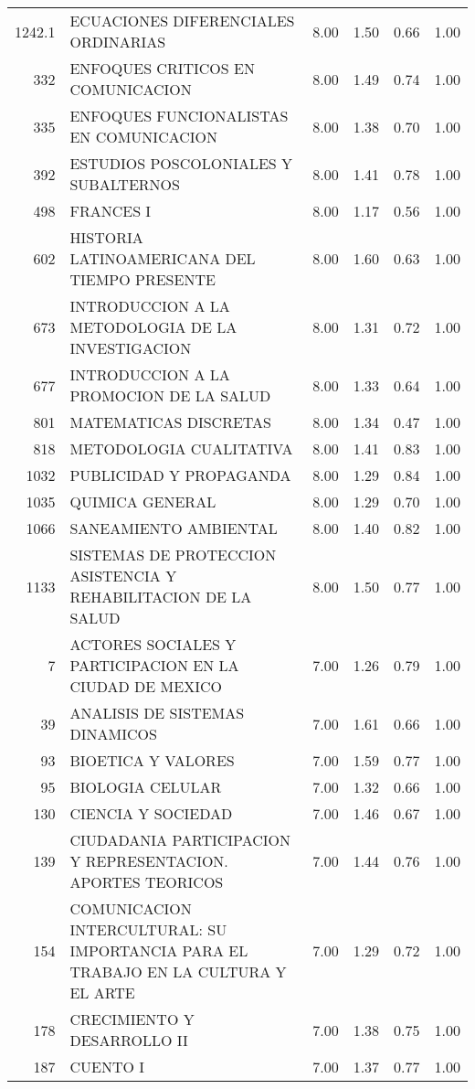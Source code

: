 \begin{table}[ht]
\begin{tabular}{rlrrrr}
  1242.1 & ECUACIONES DIFERENCIALES ORDINARIAS & 8.00 & 1.50 & 0.66 & 1.00 \\ 
  332 & ENFOQUES CRITICOS EN COMUNICACION & 8.00 & 1.49 & 0.74 & 1.00 \\ 
  335 & ENFOQUES FUNCIONALISTAS EN COMUNICACION & 8.00 & 1.38 & 0.70 & 1.00 \\ 
  392 & ESTUDIOS POSCOLONIALES Y SUBALTERNOS & 8.00 & 1.41 & 0.78 & 1.00 \\ 
  498 & FRANCES I & 8.00 & 1.17 & 0.56 & 1.00 \\ 
  602 & HISTORIA LATINOAMERICANA DEL TIEMPO PRESENTE & 8.00 & 1.60 & 0.63 & 1.00 \\ 
  673 & INTRODUCCION A LA METODOLOGIA DE LA INVESTIGACION & 8.00 & 1.31 & 0.72 & 1.00 \\ 
  677 & INTRODUCCION A LA PROMOCION DE LA SALUD & 8.00 & 1.33 & 0.64 & 1.00 \\ 
  801 & MATEMATICAS DISCRETAS & 8.00 & 1.34 & 0.47 & 1.00 \\ 
  818 & METODOLOGIA CUALITATIVA & 8.00 & 1.41 & 0.83 & 1.00 \\ 
  1032 & PUBLICIDAD Y PROPAGANDA & 8.00 & 1.29 & 0.84 & 1.00 \\ 
  1035 & QUIMICA GENERAL & 8.00 & 1.29 & 0.70 & 1.00 \\ 
  1066 & SANEAMIENTO AMBIENTAL & 8.00 & 1.40 & 0.82 & 1.00 \\ 
  1133 & SISTEMAS DE PROTECCION ASISTENCIA Y REHABILITACION DE LA SALUD & 8.00 & 1.50 & 0.77 & 1.00 \\ 
  7 & ACTORES SOCIALES Y PARTICIPACION EN LA CIUDAD DE MEXICO & 7.00 & 1.26 & 0.79 & 1.00 \\ 
  39 & ANALISIS DE SISTEMAS DINAMICOS & 7.00 & 1.61 & 0.66 & 1.00 \\ 
  93 & BIOETICA Y VALORES & 7.00 & 1.59 & 0.77 & 1.00 \\ 
  95 & BIOLOGIA CELULAR & 7.00 & 1.32 & 0.66 & 1.00 \\ 
  130 & CIENCIA Y SOCIEDAD & 7.00 & 1.46 & 0.67 & 1.00 \\ 
  139 & CIUDADANIA PARTICIPACION Y REPRESENTACION. APORTES TEORICOS & 7.00 & 1.44 & 0.76 & 1.00 \\ 
  154 & COMUNICACION INTERCULTURAL: SU IMPORTANCIA PARA EL TRABAJO EN LA CULTURA Y EL ARTE & 7.00 & 1.29 & 0.72 & 1.00 \\ 
  178 & CRECIMIENTO Y DESARROLLO II & 7.00 & 1.38 & 0.75 & 1.00 \\ 
  187 & CUENTO I & 7.00 & 1.37 & 0.77 & 1.00 \\ 

\end{tabular}
\end{table}
